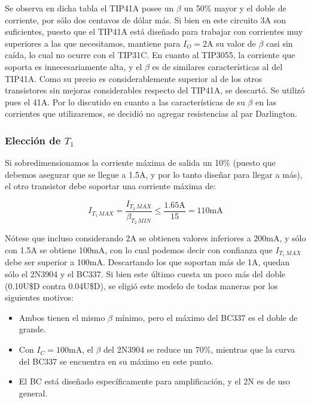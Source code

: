 \documentclass[e2_tp1_main.tex]{subfiles}
\begin{document}
Se observa en dicha tabla el TIP41A posee un $\beta$ un 50\% mayor y el doble de corriente, por s\'olo dos centavos de d\'olar m\'as. Si bien en este circuito 3A son suficientes, puesto que el TIP41A est\'a dise\~nado para trabajar con corrientes muy superiores a las que necesitamos, mantiene para $I_{O} = 2$A su valor de $\beta$ casi sin ca\'ida, lo cual no ocurre con el TIP31C. En cuanto al TIP3055, la corriente que soporta es innecesariamente alta, y el $\beta$ es de similares caracter\'isticas al del TIP41A. Como su precio es considerablemente superior al de los otros transistores sin mejoras considerables respecto del TIP41A, se descart\'o. Se utiliz\'o pues el 41A. Por lo discutido en cuanto a las caracter\'isticas de su $\beta$ en las corrientes que utilizaremos, se decidi\'o no agregar resistencias al par Darlington.


\subsubsection{Elecci\'on de $T_1$}

Si sobredimensionamos la corriente m\'axima de salida un 10\% (puesto que debemos asegurar que se llegue a 1.5A, y por lo tanto dise\~nar para llegar a m\'as), el otro transistor debe soportar una corriente m\'axima de:

\[I_{T_1\, MAX} = 
\frac{I_{T_2\, MAX}}{\beta_{T_2\,MIN}} \leq
\frac{1.65\mathrm{A}}{15} = 110\mathrm{mA} \]

N\'otese que incluso considerando 2A se obtienen valores inferiores a 200mA, y s\'olo con 1.5A se obtiene 100mA, con lo cual podemos decir con confianza que $I_{T_1\, MAX}$ debe ser superior a 100mA. Descartando los que soportan m\'as de 1A, quedan s\'olo el 2N3904 y el BC337. Si bien este \'ultimo cuesta un poco m\'as del doble (0.10U\$D contra 0.04U\$D), se eligi\'o este modelo de todas maneras por los siguientes motivos:

\begin{itemize}
	\item Ambos tienen el mismo $\beta$ m\'inimo, pero el m\'aximo del BC337 es el doble de grande.
	\item Con $I_C = 100$mA, el $\beta$ del 2N3904 se reduce un 70\%, mientras que la curva del BC337 se encuentra en su m\'aximo en este punto.
	\item El BC est\'a dise\~nado espec\'ificamente para amplificaci\'on, y el 2N es de uso general.
\end{itemize}
\end{document}
